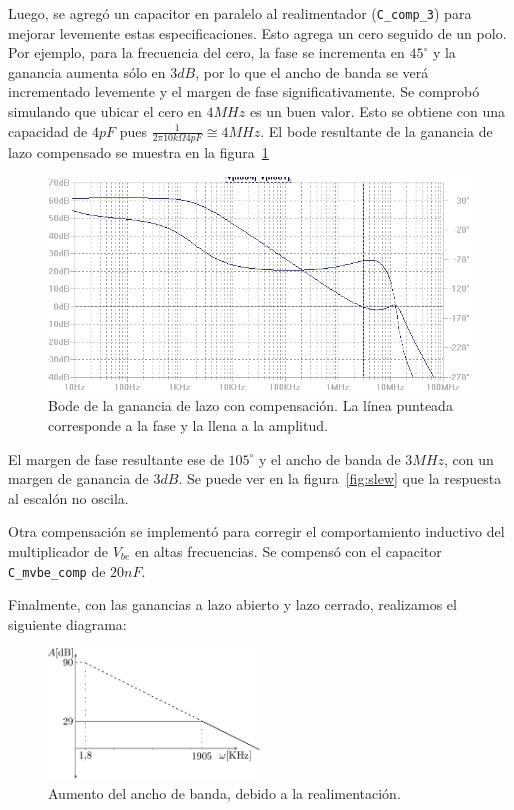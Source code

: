 \documentclass[a4paper,12pt,twoside]{article}
\begin{document}
Luego, se agregó un capacitor en paralelo al realimentador (\texttt{C\_comp\_3}) para mejorar levemente estas especificaciones. Esto agrega un cero seguido de un polo. Por ejemplo, para la frecuencia del cero, la fase se incrementa en $45^{\circ}$ y la ganancia aumenta sólo en $3dB$, por lo que el ancho de banda se verá incrementado levemente y el margen de fase significativamente. Se comprobó simulando que ubicar el cero en $4MHz$ es un buen valor. Esto se obtiene con una capacidad de $4pF$ pues $\frac{1}{2 \pi 10k\Omega 4pF}\cong 4MHz$. El bode resultante de la ganancia de lazo compensado se muestra en la figura~\ref{fig:bode-la-con-comp}

\begin{figure}[H]
	\centering
	\includegraphics[height=0.4\textwidth]{img/sim/bode-la-con-comp}
	\caption{Bode de la ganancia de lazo con compensación. La línea punteada corresponde a la fase y la llena a la amplitud.}
	\label{fig:bode-la-con-comp}
\end{figure}


El margen de fase resultante ese de $105^{\circ}$ y el ancho de banda de $3MHz$, con un margen de ganancia de $3dB$. Se puede ver en la figura~\ref{fig:slew} que la respuesta al escalón no oscila.

Otra compensación se implementó para corregir el comportamiento inductivo del multiplicador de $V_{be}$ en altas frecuencias. Se compensó con el capacitor \texttt{C\_mvbe\_comp} de $20nF$.

Finalmente, con las ganancias a lazo abierto y lazo cerrado, realizamos el siguiente diagrama:

\begin{figure}[H]
	\centering
	\includegraphics[width=0.5\textwidth]{img/bodecompensado}
	\caption{Aumento del ancho de banda, debido a la realimentación.}
	\label{fig:bode-copmensado}
\end{figure}
\end{document}
